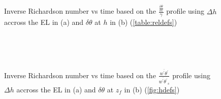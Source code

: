 \begin{figure}[htbp]

\begin{minipage}[b]{0.5\linewidth}
         
        \\
        \end{minipage}             
\quad
\begin{minipage}[b]{0.5\linewidth}
        \\
       
       \end{minipage}
        \caption{Inverse Richardson number vs time based on the $\frac{\frac{\partial \overline{\theta}}{\partial z}}{\gamma}$
profile using $\Delta h$ accross the \acs{EL} in (a) and $\delta \theta$ at $h$ in (b) (\ref{table:reldefs})}
        \label{fig:invristime}
\end{figure}

\begin{figure}[htbp]
\begin{minipage}[b]{0.5\linewidth}
         
        \\
        \end{minipage}             
\quad
\begin{minipage}[b]{0.5\linewidth}
        \\
       
       \end{minipage}
        \caption{Inverse Richardson number vs time based on the $\frac{\overline{w^{'}\theta^{'}}}{\overline{w^{'}\theta^{'}}_{s}}$
profile using $\Delta h$ accross the \acs{EL} in (a) and $\delta \theta$ at $z_{f}$ in (b) (\ref{fig:hdefs})}
        \label{fig:invristime}
\end{figure}

